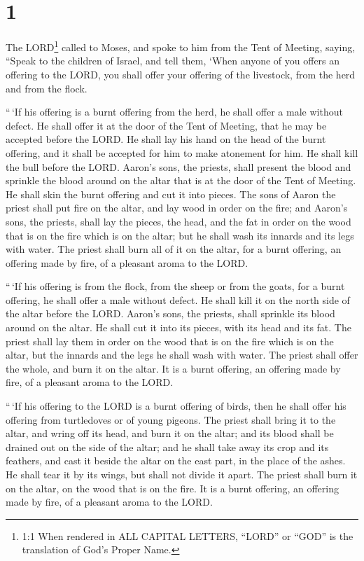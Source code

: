 \hypertarget{section}{%
\section{1}\label{section}}

 The LORD\footnote{1:1 When rendered in ALL CAPITAL LETTERS,
  ``LORD'' or ``GOD'' is the translation of God's Proper Name.} called
to Moses, and spoke to him from the Tent of Meeting, saying,
 ``Speak to the children of Israel, and tell them, `When
anyone of you offers an offering to the LORD, you shall offer your
offering of the livestock, from the herd and from the flock.

 ``\,`If his offering is a burnt offering from the herd, he
shall offer a male without defect. He shall offer it at the door of the
Tent of Meeting, that he may be accepted before the LORD. 
He shall lay his hand on the head of the burnt offering, and it shall be
accepted for him to make atonement for him.  He shall kill
the bull before the LORD. Aaron's sons, the priests, shall present the
blood and sprinkle the blood around on the altar that is at the door of
the Tent of Meeting.  He shall skin the burnt offering and
cut it into pieces.  The sons of Aaron the priest shall put
fire on the altar, and lay wood in order on the fire;  and
Aaron's sons, the priests, shall lay the pieces, the head, and the fat
in order on the wood that is on the fire which is on the altar;
 but he shall wash its innards and its legs with water. The
priest shall burn all of it on the altar, for a burnt offering, an
offering made by fire, of a pleasant aroma to the LORD.

 ``\,`If his offering is from the flock, from the sheep or
from the goats, for a burnt offering, he shall offer a male without
defect.  He shall kill it on the north side of the altar
before the LORD. Aaron's sons, the priests, shall sprinkle its blood
around on the altar.  He shall cut it into its pieces, with
its head and its fat. The priest shall lay them in order on the wood
that is on the fire which is on the altar,  but the innards
and the legs he shall wash with water. The priest shall offer the whole,
and burn it on the altar. It is a burnt offering, an offering made by
fire, of a pleasant aroma to the LORD.

 ``\,`If his offering to the LORD is a burnt offering of
birds, then he shall offer his offering from turtledoves or of young
pigeons.  The priest shall bring it to the altar, and wring
off its head, and burn it on the altar; and its blood shall be drained
out on the side of the altar;  and he shall take away its
crop and its feathers, and cast it beside the altar on the east part, in
the place of the ashes.  He shall tear it by its wings, but
shall not divide it apart. The priest shall burn it on the altar, on the
wood that is on the fire. It is a burnt offering, an offering made by
fire, of a pleasant aroma to the LORD.


